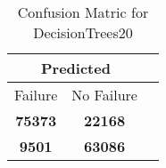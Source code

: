 \begin{table}[] 
\caption{Confusion Matric for DecisionTrees20} 
\label{Table: Prediction Accuracy-NoneDecisionTrees20OnlySunEKF-ignoreReflection100.9EKF-top2-Reflection} 
\centering 
\begin{tabular} 
 {@{}ccc@{}} 
\toprule 
\multicolumn{2}{c}{\textbf{Predicted}}
 \\ \midrule 
\multicolumn{1}{|c|}{Failure} & 
\multicolumn{1}{c|}{No Failure}
 \\ \midrule 
\multicolumn{1}{|c|}{\color{green}\textbf{75373}} & 
\multicolumn{1}{c|}{\color{red}\textbf{22168}}
 \\ \midrule 
\multicolumn{1}{|c|}{\color{red}\textbf{9501}} & 
\multicolumn{1}{c|}{\color{green}\textbf{63086}}
 \\ \bottomrule 
\end{tabular} 
\end{table} 
